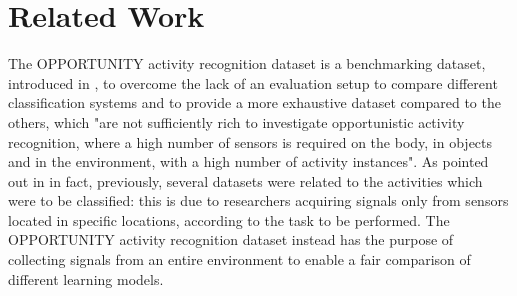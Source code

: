 
\section{Related Work}
\label{sec:related_work}

The OPPORTUNITY activity recognition dataset is a benchmarking dataset, introduced in \cite{Roggen2010}, to overcome the lack of an evaluation setup to compare different classification systems and to provide a more exhaustive dataset compared to the others, which "are not sufficiently rich to investigate opportunistic activity recognition, where a high number of sensors is required on the body, in objects and in the environment, with a high number of activity instances". As pointed out in \cite{Chavarriaga2015} in fact, previously, several datasets were related to the activities which were to be classified: this is due to researchers acquiring signals only from sensors located in specific locations, according to the task to be performed.
The OPPORTUNITY activity recognition dataset instead has the purpose of collecting signals from an entire environment to enable a fair comparison of different learning models.

